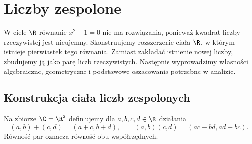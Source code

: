 \chapter{Liczby zespolone}
\label{ma1:ch:complex-numbers}

W ciele $\R$ równanie $x^2+1=0$ nie ma rozwiązania, ponieważ kwadrat liczby rzeczywistej jest nieujemny. Skonstruujemy rozszerzenie ciała $\R$, w którym istnieje pierwiastek tego równania. Zamiast zakładać istnienie nowej liczby, zbudujemy ją jako parę liczb rzeczywistych. Następnie wyprowadzimy własności algebraiczne, geometryczne i podstawowe oszacowania potrzebne w analizie.

\section{Konstrukcja ciała liczb zespolonych}
\begin{definicja}
\label{ma1:def:complex-pairs}
Na zbiorze $\C=\R^2$ definiujemy dla $a,b,c,d\in\R$ działania
\[
 (a,b)+(c,d)=(a+c,b+d),\qquad
 (a,b)(c,d)=(ac-bd,ad+bc).
\]
Równość par oznacza równość obu współrzędnych.
\end{definicja}

